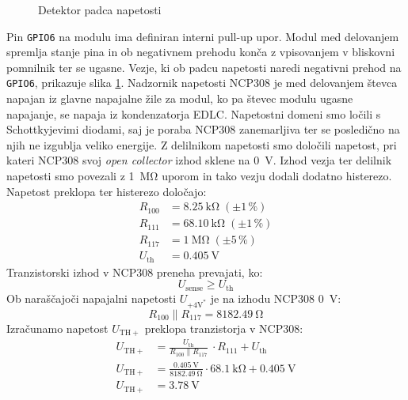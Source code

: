 \documentclass[a4paper,twoside,openright,12pt,slovene]{book}
\begin{document}
\begin{figure}[h]
    \centering
    
    \caption{Detektor padca napetosti}
    \label{fastshutdovn_vezje}
\end{figure}
Pin \texttt{GPIO6} na modulu ima definiran interni pull-up upor. Modul med delovanjem spremlja stanje pina in ob negativnem prehodu konča z vpisovanjem v bliskovni pomnilnik ter se ugasne. Vezje, ki ob padcu napetosti naredi negativni prehod na \texttt{GPIO6}, prikazuje slika \ref{fastshutdovn_vezje}.
Nadzornik napetosti NCP308 je med delovanjem števca napajan iz glavne napajalne žile za modul, ko pa števec modulu ugasne napajanje, se napaja iz kondenzatorja EDLC. Napetostni domeni smo ločili s Schottkyjevimi diodami, saj je poraba NCP308 zanemarljiva ter se posledično na njih ne izgublja veliko energije. Z delilnikom napetosti smo določili napetost, pri kateri NCP308 svoj \textit{open collector} izhod sklene na \SI{0}{\volt}. Izhod vezja ter delilnik napetosti smo povezali z \SI{1}{\mega\ohm} uporom in tako vezju dodali dodatno histerezo. Napetost preklopa ter histerezo določajo:
\begin{equation}
\begin{aligned}
   R_{100} &= \SI{8.25}{\kilo\ohm} \; (\pm1\,\%) \\ 
   R_{111} &= \SI{68.10}{\kilo\ohm} \; (\pm1\,\%) \\
   R_{117} &= \SI{1}{\mega\ohm} \; (\pm5\,\%) \\
    U_{\text{th}} &= \SI{0.405}{\volt}
\end{aligned}
\end{equation}
Tranzistorski izhod v NCP308 preneha prevajati, ko:
\begin{equation}
    U_{\text{sense}} \ge U_{\text{th}}
\end{equation}
Ob naraščajoči napajalni napetosti $U_{+4\mathrm{V}^\ast}$ je na izhodu NCP308 \SI{0}{\volt}:
\begin{equation}
    R_{100} \parallel R_{117} = \SI{8182.49}{\ohm}
\end{equation}
Izračunamo napetost $U_{\mathrm{TH}+}$ preklopa tranzistorja v NCP308:
\begin{equation}
\begin{aligned}
    U_{\mathrm{TH}+} &= \frac{U_{\text{th}}}{R_{100} \parallel R_{117}}\ \cdot R_{111} + U_{\text{th}} \\
    U_{\mathrm{TH}+} &= \frac{\SI{0.405}{\volt}}{\SI{8182,49}{\ohm}}\cdot \SI{68.1}{\kilo\ohm} + \SI{0.405}{\volt} \\
    U_{\mathrm{TH}+} &= \SI{3.78}{\volt}
\end{aligned}
\end{equation}
\end{document}
